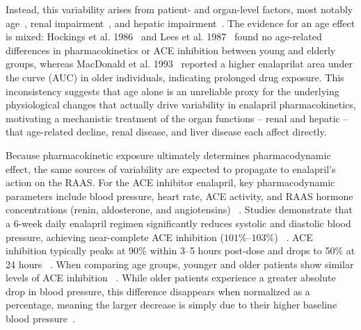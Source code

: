Instead, this variability arises from patient- and organ-level factors, most notably age~\cite{Hockings1986, Lees1987a, MacDonald1993}, renal impairment~\cite{Fruncillo1987, Kelly1986, Lowenthal1984}, and hepatic impairment~\cite{Baba1990, Ohnishi1989}. The evidence for an age effect is mixed: Hockings et al. 1986~\cite{Hockings1986} and Lees et al. 1987~\cite{Lees1987a} found no age-related differences in pharmacokinetics or ACE inhibition between young and elderly groups, whereas MacDonald et al. 1993~\cite{MacDonald1993} reported a higher enalaprilat area under the curve (AUC) in older individuals, indicating prolonged drug exposure. This inconsistency suggests that age alone is an unreliable proxy for the underlying physiological changes that actually drive variability in enalapril pharmacokinetics, motivating a mechanistic treatment of the organ functions -- renal and hepatic -- that age-related decline, renal disease, and liver disease each affect directly.

Because pharmacokinetic exposure ultimately determines pharmacodynamic effect, the same sources of variability are expected to propagate to enalapril's action on the RAAS. For the ACE inhibitor enalapril, key pharmacodynamic parameters include blood pressure, heart rate, ACE activity, and RAAS hormone concentrations (renin, aldosterone, and angiotensins) ~\cite{Donnelly1987, Lees1987a, Ribeiro1996, Shionoiri1985}. Studies demonstrate that a 6-week daily enalapril regimen significantly reduces systolic and diastolic blood pressure, achieving near-complete ACE inhibition (\(101\%\)--\(103\%\)) ~\cite{Donnelly1990}. ACE inhibition typically peaks at 90\% within 3--5 hours post-dose and drops to 50\% at 24 hours ~\cite{Ribeiro1996}. When comparing age groups, younger and older patients show similar levels of ACE inhibition ~\cite{Lees1987a}. While older patients experience a greater absolute drop in blood pressure, this difference disappears when normalized as a percentage, meaning the larger decrease is simply due to their higher baseline blood pressure~\cite{Lees1987a}.

